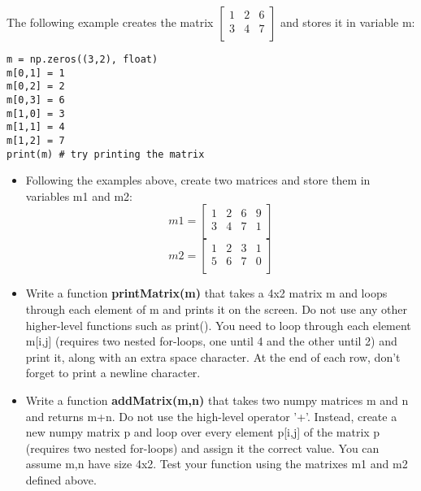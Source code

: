 \documentclass[11pt,a4paper]{report}
\begin{document}
The following example creates the matrix $\left[ {\begin{array}{cccc}
   1 & 2 & 6\\     
   3 & 4 & 7\\
   \end{array} } \right]$ and stores it in variable m:
   
\begin{lstlisting}
m = np.zeros((3,2), float)
m[0,1] = 1
m[0,2] = 2
m[0,3] = 6
m[1,0] = 3
m[1,1] = 4
m[1,2] = 7
print(m) # try printing the matrix
\end{lstlisting}


\begin{itemize}
 \item Following the examples above, create two matrices and store them in variables m1 and m2:
   \[ m1= \left[ {\begin{array}{cccc}
   1 & 2 & 6 & 9\\     
   3 & 4 & 7 & 1\\
   \end{array} } \right]
\]
   \[ m2= \left[ {\begin{array}{cccc}
   1 & 2 & 3 & 1\\     
   5 & 6 & 7 & 0\\
   \end{array} } \right]
\]

 \item Write a function \textbf{printMatrix(m)} that takes a 4x2 matrix m and loops through each element of m and prints it on the screen. Do not use any other higher-level functions such as print(). You need to loop through each element m[i,j] (requires two nested for-loops, one until 4 and the other until 2) and print it, along with an extra space character. At the end of each row, don't forget to print a newline character. 
 
 \item Write a function \textbf{addMatrix(m,n)} that takes two numpy matrices m and n and returns m+n. Do not use the high-level operator '+'. Instead, create a new numpy matrix p and loop over every element p[i,j] of the matrix p (requires two nested for-loops) and assign it the correct value. You can assume m,n have size 4x2.
 Test your function using the matrixes m1 and m2 defined above.
 

\end{itemize}
\end{document}
